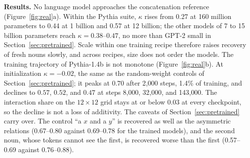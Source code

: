 \documentclass[10pt]{article}
\theoremstyle{plain}
\theoremstyle{remark}
\begin{document}
\textbf{Results.} No language model approaches the concatenation reference (Figure~\ref{fig:real}a). Within the Pythia suite, $\kappa$ rises from 0.27 at 160 million parameters to 0.44 at 1 billion and 0.57 at 12 billion; the other models of 7 to 15 billion parameters reach $\kappa = 0.38$--$0.47$, no more than GPT-2 small in Section~\ref{sec:pretrained}. Scale within one training recipe therefore raises recovery of fresh nouns slowly, and across recipes, size does not order the models. The training trajectory of Pythia-1.4b is not monotone (Figure~\ref{fig:real}b). At initialization $\kappa = -0.02$, the same as the random-weight controls of Section~\ref{sec:pretrained}; it peaks at $0.70$ after 2{,}000 steps, 1.4\% of training, and declines to $0.57$, $0.52$, and $0.47$ at steps 8{,}000, 32{,}000, and 143{,}000. The interaction share on the $12 \times 12$ grid stays at or below 0.03 at every checkpoint, so the decline is not a loss of additivity. The caveats of Section~\ref{sec:pretrained} carry over. The control ``a $x$ and a $y$'' is recovered as well as the asymmetric relations (0.67--0.80 against 0.69--0.78 for the trained models), and the second noun, whose tokens cannot see the first, is recovered worse than the first (0.57--0.69 against 0.76--0.88).
\end{document}
